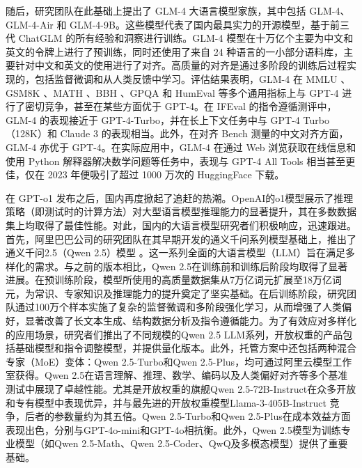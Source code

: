 随后，研究团队在此基础上提出了 GLM-4 大语言模型家族\cite{glm2024chatglmfamilylargelanguage}，其中包括 GLM-4、GLM-4-Air 和 GLM-4-9B。这些模型代表了国内最具实力的开源模型，基于前三代 ChatGLM 的所有经验和洞察进行训练。GLM-4 模型在十万亿个主要为中文和英文的令牌上进行了预训练，同时还使用了来自 24 种语言的一小部分语料库，主要针对中文和英文的使用进行了对齐。高质量的对齐是通过多阶段的训练后过程实现的，包括监督微调和从人类反馈中学习。评估结果表明，GLM-4 在 MMLU \cite{hendrycks2021measuringmassivemultitasklanguage}、GSM8K \cite{cobbe2021trainingverifierssolvemath}、MATH \cite{hendrycks2021measuringmathematicalproblemsolving}、BBH \cite{suzgun2022challengingbigbenchtaskschainofthought}、GPQA \cite{rein2023gpqagraduatelevelgoogleproofqa} 和 HumEval \cite{peng2024humanevalxlmultilingualcodegeneration} 等多个通用指标上与 GPT-4 进行了密切竞争，甚至在某些方面优于 GPT-4。在 IFEval \cite{zhou2023instructionfollowingevaluationlargelanguage} 的指令遵循测评中，GLM-4 的表现接近于 GPT-4-Turbo，并在长上下文任务中与 GPT-4 Turbo（128K）和 Claude 3 的表现相当。此外，在对齐 Bench 测量的中文对齐方面，GLM-4 亦优于 GPT-4。在实际应用中，GLM-4 在通过 Web 浏览获取在线信息和使用 Python 解释器解决数学问题等任务中，表现与 GPT-4 All Tools 相当甚至更佳，仅在 2023 年便吸引了超过 1000 万次的 HuggingFace 下载。


在 GPT-o1 \cite{wu2024comparativestudyreasoningpatterns} 发布之后，国内再度掀起了追赶的热潮。OpenAI的o1模型展示了推理策略（即测试时的计算方法）对大型语言模型推理能力的显著提升，其在多数数据集上均取得了最佳性能。对此，国内的大语言模型研究者们积极响应，迅速跟进。首先，阿里巴巴公司的研究团队在其早期开发的通义千问系列模型基础上，推出了通义千问2.5（Qwen 2.5）模型  \cite{qwen2025qwen25technicalreport}。这一系列全面的大语言模型（LLM）旨在满足多样化的需求。与之前的版本相比，Qwen 2.5在训练前和训练后阶段均取得了显著进展。在预训练阶段，模型所使用的高质量数据集从7万亿词元扩展至18万亿词元，为常识、专家知识及推理能力的提升奠定了坚实基础。在后训练阶段，研究团队通过100万个样本实施了复杂的监督微调和多阶段强化学习，从而增强了人类偏好，显著改善了长文本生成、结构数据分析及指令遵循能力。为了有效应对多样化的应用场景，研究者们推出了不同规模的Qwen 2.5 LLM系列，开放权重的产品包括基础模型和指令调整模型，并提供量化版本。此外，托管方案中还包括两种混合专家（MoE）变体：Qwen 2.5-Turbo和Qwen 2.5-Plus，均可通过阿里云模型工作室获得。Qwen 2.5在语言理解、推理、数学、编码以及人类偏好对齐等多个基准测试中展现了卓越性能。尤其是开放权重的旗舰Qwen 2.5-72B-Instruct在众多开放和专有模型中表现优异，并与最先进的开放权重模型Llama-3-405B-Instruct \cite{grattafiori2024llama3herdmodels} 竞争，后者的参数量约为其五倍。Qwen 2.5-Turbo和Qwen 2.5-Plus在成本效益方面表现出色，分别与GPT-4o-mini和GPT-4o相抗衡。此外，Qwen 2.5模型为训练专业模型（如Qwen 2.5-Math、Qwen 2.5-Coder、QwQ及多模态模型）提供了重要基础。

